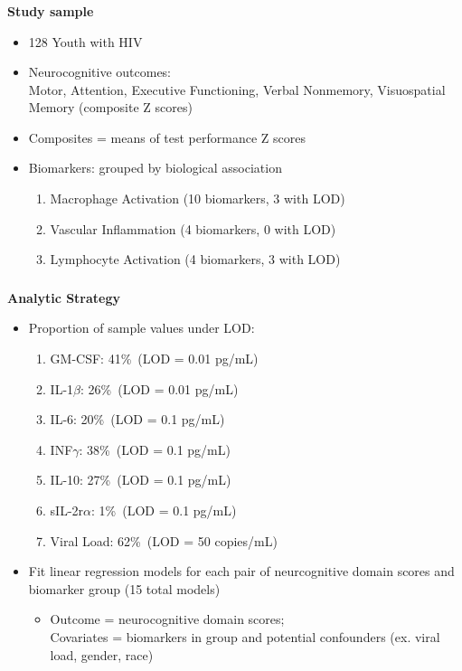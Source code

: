 \documentclass[xcolor=dvipsnames]{beamer}
\begin{document}
\begin{frame}
\frametitle{\insertsectionhead}
\textbf{Study sample}
\begin{itemize}
\item 128 Youth with HIV
\item Neurocognitive outcomes: \\
Motor, Attention, Executive Functioning, Verbal Nonmemory, Visuospatial Memory (composite Z scores)
\item Composites = means of test performance Z scores
\item Biomarkers: grouped by biological association
	\begin{enumerate}
	\item Macrophage Activation (10 biomarkers, 3 with LOD)
	\item Vascular Inflammation (4 biomarkers, 0 with LOD)
	\item Lymphocyte Activation (4 biomarkers, 3 with LOD)
	\end{enumerate}
\end{itemize}
\end{frame}

\begin{frame}
\frametitle{\insertsectionhead}
\textbf{Analytic Strategy}
\begin{itemize}
\item Proportion of sample values under LOD:
\begin{enumerate}
\item GM-CSF: 41\%\  (LOD = 0.01 pg/mL)
\item IL-1$\beta$: 26\%\ (LOD = 0.01 pg/mL)
\item IL-6: 20\%\ (LOD = 0.1 pg/mL)
\item INF$\gamma$: 38\%\ (LOD = 0.1 pg/mL)
\item IL-10: 27\%\ (LOD = 0.1 pg/mL)
\item sIL-2r$\alpha$: 1\%\ (LOD = 0.1 pg/mL)
\item Viral Load: 62\%\ (LOD = 50 copies/mL)
\end{enumerate}
\item Fit linear regression models for each pair of neurcognitive domain scores and biomarker group (15 total models)
\begin{itemize}
\item Outcome = neurocognitive domain scores;\\
Covariates = biomarkers in group and potential confounders (ex. viral load, gender, race) 
\end{itemize}
\end{itemize}
\end{frame}
\end{document}

